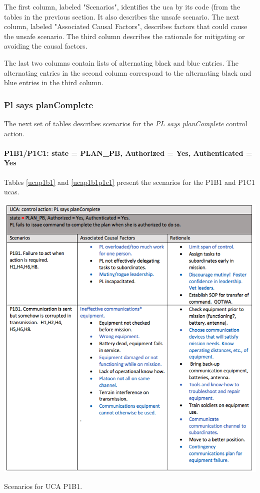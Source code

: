 \documentclass[../../main/main.tex]{subfiles}
\begin{document}
The first column, labeled "Scenarios", identifies the \gls{uca} by its code (from the tables in  the previous section.  It also describes the unsafe scenario.  The next column, labeled "Associated Causal Factors", describes factors that could cause the unsafe scenario.  The third column describes the rationale for mitigating or avoiding the causal factors.  

The last two columns contain lists of alternating black and blue entries.  The alternating entries in the second column correspond to the alternating black and blue entries in the third column.  
\clearpage
\subsubsection*{Pl says planComplete}
The next set of tables describes scenarios for the \textit{PL says planComplete} control action.
\paragraph*{P1B1/P1C1: state = PLAN_PB, Authorized = Yes, Authenticated = Yes}
Tables \ref{ucap1b1} and \ref{ucap1b1p1c1} present the scenarios for the P1B1 and P1C1 \glspl{uca}.

\begin{table}[ht!]
\begin{center}
\includegraphics[width=\linewidth]{../figures/ucap1b1}
\caption{Scenarios for UCA P1B1.}
\label{ucap1b1}
\end{center}
\end{table}
\clearpage
\end{document}
